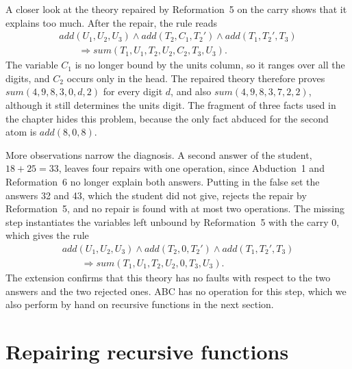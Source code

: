 \documentclass[preprint,12pt]{elsarticle}
\newcommand{\imp}{\Longrightarrow}
\begin{document}
A closer look at the theory repaired by Reformation~5 on the carry shows
that it explains too much. After the repair, the rule reads
\[
\begin{array}{l}
  \mathit{add}(U_1, U_2, U_3) \wedge \mathit{add}(T_2, C_1, T_2') \wedge
  \mathit{add}(T_1, T_2', T_3) \\
  \qquad \imp \mathit{sum}(T_1, U_1, T_2, U_2, C_2, T_3, U_3).
\end{array}
\]
The variable $C_1$ is no longer bound by the units column, so it ranges
over all the digits, and $C_2$ occurs only in the head. The repaired theory
therefore proves $\mathit{sum}(4, 9, 8, 3, 0, d, 2)$ for every digit $d$,
and also $\mathit{sum}(4, 9, 8, 3, 7, 2, 2)$, although it still determines
the units digit. The fragment of three facts used in the chapter hides this
problem, because the only fact abduced for the second atom is
$\mathit{add}(8, 0, 8)$.

More observations narrow the diagnosis. A second answer of the student,
$18 + 25 = 33$, leaves four repairs with one operation, since Abduction~1
and Reformation~6 no longer explain both answers. Putting in the false set
the answers 32 and 43, which the student did not give, rejects the
repair by Reformation~5, and no repair is found with at most two
operations. The missing step instantiates the variables left unbound by
Reformation~5 with the carry 0, which gives the rule
\[
\begin{array}{l}
  \mathit{add}(U_1, U_2, U_3) \wedge \mathit{add}(T_2, 0, T_2') \wedge
  \mathit{add}(T_1, T_2', T_3) \\
  \qquad \imp \mathit{sum}(T_1, U_1, T_2, U_2, 0, T_3, U_3).
\end{array}
\]
The extension confirms that this theory has no faults with respect to the
two answers and the two rejected ones. ABC has no operation for this step,
which we also perform by hand on recursive functions in the next section.

\section{Repairing recursive functions}
\label{sec:functions}
\end{document}
